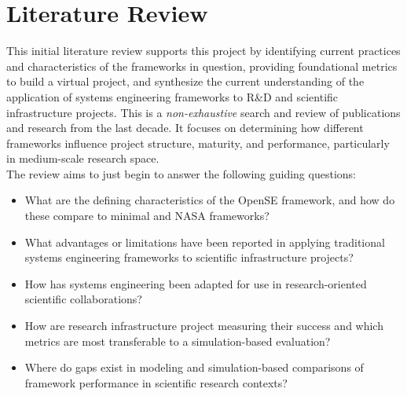 \chapter{Literature Review}
\label{chapter:lit}
This initial literature review supports this project by identifying current practices and characteristics of the frameworks in question, providing foundational metrics to build a virtual project, and synthesize the current understanding of the application of systems engineering frameworks to R\&D and scientific infrastructure projects. 
This is a \textit{non-exhaustive} search and review of publications and research from the last decade. 
It focuses on determining how different frameworks influence project structure, maturity, and performance, particularly in medium-scale research space.\\
The review aims to just begin to answer the following guiding questions:
\begin{itemize}[noitemsep, topsep=0pt]
    \item What are the defining characteristics of the OpenSE framework, and how do these compare to minimal and NASA frameworks?
    \item What advantages or limitations have been reported in applying traditional systems engineering frameworks to scientific infrastructure projects?
    \item How has systems engineering been adapted for use in research-oriented scientific collaborations?
    \item How are research infrastructure project measuring their success and which metrics are most transferable to a simulation-based evaluation?
    \item Where do gaps exist in modeling and simulation-based comparisons of framework performance in scientific research contexts?
\end{itemize}
